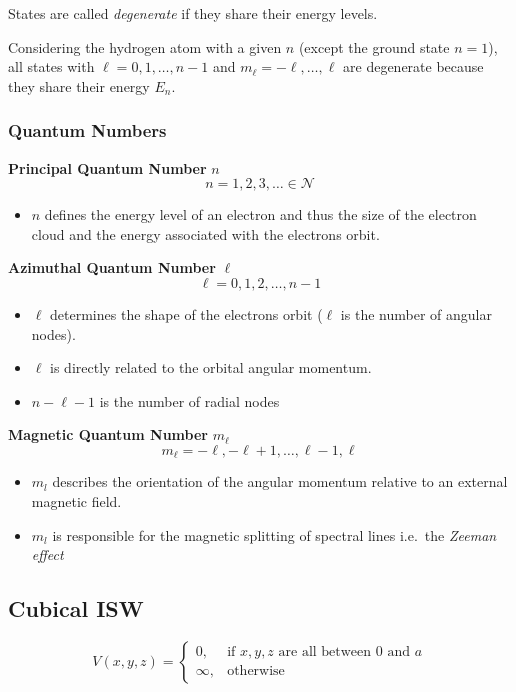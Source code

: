 
States are called \textit{degenerate} if they share their energy levels.

Considering the hydrogen atom with a given $n$ (except the ground state $n=1$), all states with $\ell=0,1,\ldots, n-1$ and $m_\ell=-\ell, \ldots, \ell$ are degenerate because they share their energy $E_n$.


\subsubsection{Quantum Numbers}
\textbf{Principal Quantum Number} $n$
\noindent\begin{equation*}
    n = 1, 2, 3, \ldots \in \mathcal{N}
\end{equation*}
\begin{itemize}
    \item $n$ defines the energy level of an electron and thus the size of the electron cloud and the energy associated with the electrons orbit.
\end{itemize}

\newpar{}
\textbf{Azimuthal Quantum Number} $\ell$
\noindent\begin{equation*}
    \ell = 0, 1, 2, \ldots , n-1
\end{equation*}
\begin{itemize}
    \item $\ell$ determines the shape of the electrons orbit ($\ell$ is the number of angular nodes).
    \item $\ell$ is directly related to the orbital angular momentum.
    \item $n-\ell-1$ is the number of radial nodes
\end{itemize}

\newpar{}
\textbf{Magnetic Quantum Number} $m_\ell$
\noindent\begin{equation*}
    m_\ell =-\ell, -\ell+1, \ldots , \ell-1, \ell
\end{equation*}
\begin{itemize}
    \item $m_l$ describes the orientation of the angular momentum relative to an external magnetic field.
    \item $m_l$ is responsible for the magnetic splitting of spectral lines i.e.\ the \textit{Zeeman effect}
\end{itemize}

\subsection{Cubical ISW}
\noindent\begin{equation*}
    V(x,y,z)=\begin{cases}0,&\text{if }x,y,z\text{ are all between }0\text{ and }a\\\infty,&\text{otherwise}\end{cases}
\end{equation*}

